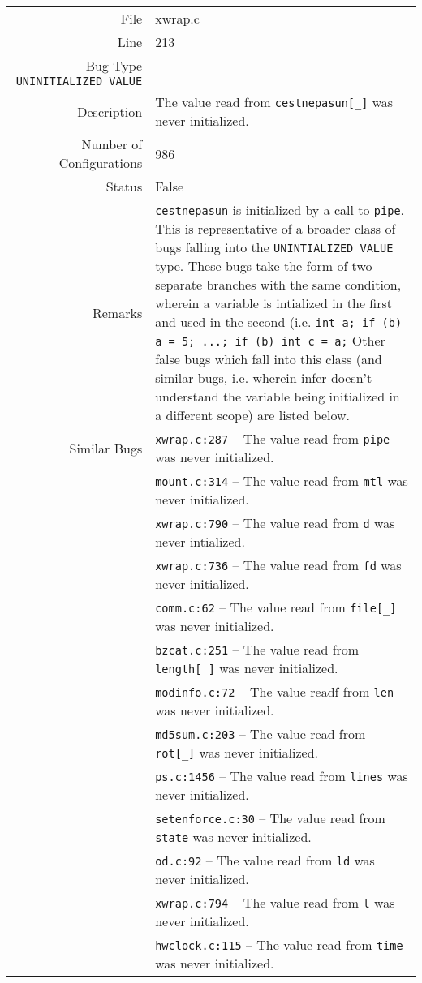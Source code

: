 \noindent\begin{tabularx}{\textwidth}{rY}
  \toprule
  File & xwrap.c\\
  Line & 213\\
  Bug Type \texttt{UNINITIALIZED\_VALUE}& \\
  Description & The value read from \texttt{cestnepasun[\_]} was never initialized.\\
  Number of Configurations & 986\\
  \midrule
  Status & False\\
  Remarks & \texttt{cestnepasun} is initialized by a call to \texttt{pipe}. This is representative of a broader class of bugs falling into the \texttt{UNINTIALIZED\_VALUE} type. These bugs take the form of two separate branches with the same condition, wherein a variable is intialized in the first and used in the second (i.e. \texttt{int a; if (b) a = 5; ...; if (b) int c = a;} Other false bugs which fall into this class (and similar bugs, i.e. wherein infer doesn't understand the variable being initialized in a different scope) are listed below.\\
  Similar Bugs & \texttt{xwrap.c:287} -- The value read from \texttt{pipe} was never initialized. \\
  & \texttt{mount.c:314} -- The value read from \texttt{mtl} was never initialized. \\
  & \texttt{xwrap.c:790} -- The value read from \texttt{d} was never intialized. \\
  & \texttt{xwrap.c:736} -- The value read from \texttt{fd} was never initialized. \\
  & \texttt{comm.c:62} -- The value read from \texttt{file[\_]} was never initialized.\\
  & \texttt{bzcat.c:251} -- The value read from \texttt{length[\_]} was never initialized. \\
  & \texttt{modinfo.c:72} -- The value readf from \texttt{len} was never initialized.\\
  & \texttt{md5sum.c:203} -- The value read from \texttt{rot[\_]} was never initialized.\\
  & \texttt{ps.c:1456} -- The value read from \texttt{lines} was never initialized. \\
  & \texttt{setenforce.c:30} -- The value read from \texttt{state} was never initialized. \\
  & \texttt{od.c:92} -- The value read from \texttt{ld} was never initialized. \\
  & \texttt{xwrap.c:794} -- The value read from \texttt{l} was never initialized. \\
  & \texttt{hwclock.c:115} -- The value read from \texttt{time} was never initialized. \\
  \bottomrule
\end{tabularx}

